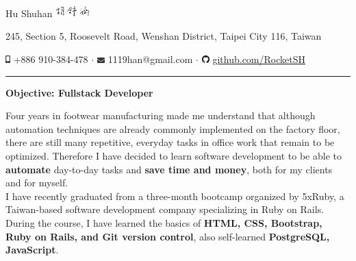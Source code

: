 \documentclass[a4paper,10pt]{article}
\begin{document}
\pagestyle{empty} %
\frenchspacing


\begin{center}
  \Huge{Hu Shuhan \includegraphics[height=1.2em,trim=0 10mm 0 -1cm]{shared/signature.png}}\par

\normalsize 245, Section 5, Roosevelt Road, Wenshan District, Taipei City 116, Taiwan 
\vspace*{.3em}

  \includegraphics[width=0.5em]{shared/mobile-alt.eps} {+886 910-384-478} $\cdot$
  \includegraphics[width=0.8em]{shared/envelope.eps} {1119han@gmail.com} $\cdot$
  \includegraphics[width=0.8em]{shared/github.eps}
  \href{https://github.com/RocketSH}{github.com/RocketSH} 

\rule{15.2cm}{0.05em}
\vspace*{.5em}
\begin{center}
  \large{\textbf{Objective: Fullstack Developer}}
\end{center}
\vspace*{.5em}

\begin{center}
  \begin{minipage}{0.9\textwidth}
    Four years in footwear manufacturing made me understand that although automation techniques are already commonly
    implemented on the factory floor, there are still many repetitive, everyday tasks in office work that remain to be optimized. Therefore I have decided to learn software development to be able to \textbf{automate} day-to-day tasks and \textbf{save
    time and money}, both for my clients and for myself.
    \vspace*{1em}\\
    I have recently graduated from a three-month bootcamp organized by 5xRuby, a Taiwan-based
    software development company specializing in Ruby on Rails.
    During the course, I have learned the basics of \textbf{HTML, CSS, Bootstrap, Ruby on
    Rails, and Git version control}, also self-learned
  \textbf{PostgreSQL, JavaScript}.
  \end{minipage}
\end{center}
\vspace*{.8em}


\end{center}
\end{document}
